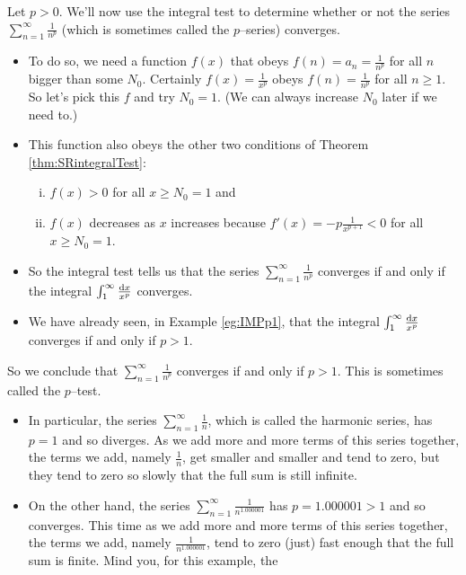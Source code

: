 \begin{eg}[The $p$ test:  $\sum\limits_{n=1}^\infty\frac{1}{n^p}$]
                                                    \label{eg:SRpTest}
Let $p>0$. We'll now use the integral test to determine whether or not the
series $\sum_{n=1}^\infty\frac{1}{n^p}$ (which is sometimes called
the $p$--series) converges.
\begin{itemize}
\item To do so, we
need a function $f(x)$ that obeys $f(n)=a_n=\frac{1}{n^p}$ for all $n$
bigger than some $N_0$. Certainly $f(x)=\frac{1}{x^p}$ obeys
$f(n)=\frac{1}{n^p}$ for all $n\ge 1$. So let's pick this $f$ and try $N_0=1$.
(We can always increase $N_0$ later if we need to.)
\item
This function also obeys the other two conditions of
Theorem \ref{thm:SRintegralTest}:
\begin{enumerate}[(i)]
\item $f(x)>0$ for all $x\ge N_0=1$ and
\item $f(x)$ decreases as $x$ increases because $f'(x)=-p\frac{1}{x^{p+1}}<0$
for all $x\ge N_0=1$.
\end{enumerate}
\item
So the integral test tells us that the series
$\sum_{n=1}^\infty\frac{1}{n^p}$ converges if and only if the integral
$\int_1^\infty\frac{\mathrm{d}x}{x^p}$ converges.
\item
We have already seen, in Example \ref{eg:IMPp1}, that
the integral $\int_1^\infty\frac{\mathrm{d}x}{x^p}$ converges if and only if $p>1$.
\end{itemize}
So we conclude that $\sum_{n=1}^\infty\frac{1}{n^p}$ converges if
and only if $p>1$. This is sometimes called the $p$--test.
\begin{itemize}
\item
In particular, the series $\sum_{n=1}^\infty\frac{1}{n}$,
which is called the harmonic series, has $p=1$ and so diverges.
As we add more and more terms of this series together, the terms we add,
namely $\frac{1}{n}$, get smaller and smaller and tend to zero,
but they tend to zero so slowly
that the full sum is still infinite.
\item
On the other hand, the series $\sum_{n=1}^\infty\frac{1}{n^{1.000001}}$ has
$p = 1.000001>1$ and so converges. This time as we add more and more
terms of this series together, the terms we add, namely
$\frac{1}{n^{1.000001}}$, tend to zero (just) fast enough that
the full sum is finite. Mind you, for this example, the

\end{itemize}
\end{eg}
